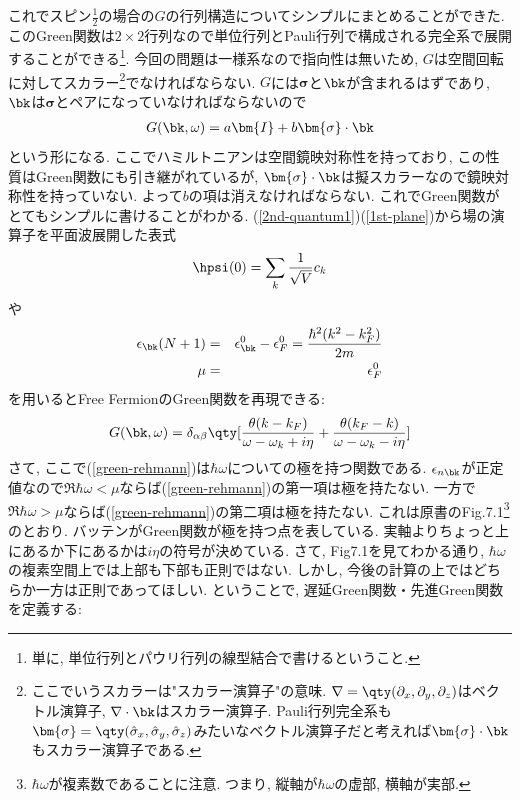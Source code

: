 \documentclass[10.5pt,a4paper]{jreport}
\begin{document}
これでスピン$\frac{1}{2}$の場合の$G$の行列構造についてシンプルにまとめることができた. このGreen関数は$2\times2$行列なので単位行列とPauli行列で構成される完全系で展開することができる\footnote{単に, 単位行列とパウリ行列の線型結合で書けるということ.}. 今回の問題は一様系なので指向性は無いため, $G$は空間回転に対してスカラー\footnote{ここでいうスカラーは"スカラー演算子"の意味. $\nabla = \qty(\partial_x, \partial_y, \partial_z)$はベクトル演算子, $\nabla\cdot\bk$はスカラー演算子. Pauli行列完全系も$\bm{\sigma} = \qty(\hat{\sigma}_x, \hat{\sigma}_y, \hat{\sigma}_z)$みたいなベクトル演算子だと考えれば$\bm{\sigma}\cdot\bk$もスカラー演算子である. }でなければならない. $G$には$\bm{\sigma}$と$\bk$が含まれるはずであり, $\bk$は$\bm{\sigma}$とペアになっていなければならないので
\begin{eqnarray}
  G(\bk, \omega) = a\bm{I} + b\bm{\sigma}\cdot\bk
\end{eqnarray}
という形になる. ここでハミルトニアンは空間鏡映対称性を持っており, この性質はGreen関数にも引き継がれているが, $\bm{\sigma}\cdot\bk$は擬スカラーなので鏡映対称性を持っていない. よって$b$の項は消えなければならない. これでGreen関数がとてもシンプルに書けることがわかる. (\ref{2nd-quantum1})(\ref{1st-plane})から場の演算子を平面波展開した表式
\begin{eqnarray}
  \hpsi(0) = \sum_k\frac{1}{\sqrt{V}}c_k
\end{eqnarray}
や
\begin{eqnarray}
  \epsilon_{\bk}(N+1) &=& \epsilon_{\bk}^0 - \epsilon_F^0 = \frac{\hbar^2(k^2 - k_F^2)}{2m}\\
  \mu &=& \epsilon_F^0
\end{eqnarray}
を用いるとFree FermionのGreen関数を再現できる:
\begin{eqnarray}
  G(\bk, \omega) = \delta_{\alpha\beta}\qty[\frac{\theta(k-k_F)}{\omega - \omega_k + i\eta} + \frac{\theta(k_F-k)}{\omega - \omega_k - i\eta}]
\end{eqnarray}
さて, ここで(\ref{green-rehmann})は$\hbar\omega$についての極を持つ関数である. $\epsilon_{n\bk}$が正定値なので$\Re\hbar\omega < \mu$ならば(\ref{green-rehmann})の第一項は極を持たない. 一方で$\Re\hbar\omega > \mu$ならば(\ref{green-rehmann})の第二項は極を持たない. これは原書のFig.7.1\footnote{$\hbar\omega$が複素数であることに注意. つまり, 縦軸が$\hbar\omega$の虚部, 横軸が実部.}のとおり. バッテンがGreen関数が極を持つ点を表している. 実軸よりちょっと上にあるか下にあるかは$i\eta$の符号が決めている. さて, Fig7.1を見てわかる通り, $\hbar\omega$の複素空間上では上部も下部も正則ではない. しかし, 今後の計算の上ではどちらか一方は正則であってほしい. ということで, 遅延Green関数・先進Green関数を定義する:
\end{document}

